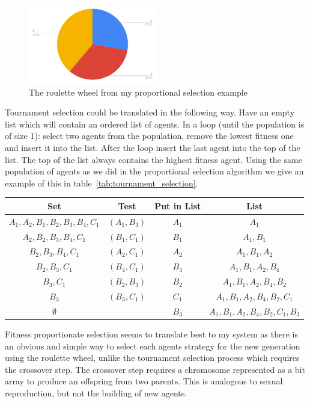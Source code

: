 \documentclass[]{final_report}
\begin{document}
\begin{figure}
	\begin{center}
	\includegraphics[width=0.5\textwidth]{reproduction_chart.png}
	\caption{The roulette wheel from my proportional selection example}
	\label{fig:roulette_wheel}
	\end{center}
\end{figure}
Tournament selection could be translated in the following way. Have an empty list which will contain an ordered list of agents. In a loop (until the population is of size 1): select two agents from the population, remove the lowest fitness one and insert it into the list. After the loop insert the last agent into the top of the list. The top of the list always contains the highest fitness agent. Using the same population of agents as we did in the proportional selection algorithm we give an example of this in table~\ref{tab:tournament_selection}.
\begin{framed}
	\begin{center}
		\begin{tabular}{c|c|c|c}
		Set & Test & Put in List & List\\
		\hline
		${A_1, A_2, B_1, B_2, B_3, B_4, C_1}$ & $(A_1, B_3)$ & $A_1$ & ${A_1}$ \\
		${A_2, B_2, B_3, B_4, C_1}$ & $(B_1, C_1)$ & $B_1$ & ${A_1, B_1}$\\
		${B_2, B_3, B_4, C_1}$ & $(A_2, C_1)$ & $A_2$ & ${A_1, B_1, A_2}$\\
		${B_2, B_3, C_1}$ & $(B_4, C_1)$ & $B_4$ & ${A_1, B_1, A_2, B_4}$\\
		${B_3, C_1}$ & $(B_2, B_3)$ & $B_2$ & ${A_1, B_1, A_2, B_4, B_2}$\\
		${B_3}$ & $(B_3, C_1)$ & $C_1$ & ${A_1, B_1, A_2, B_4, B_2, C_1}$\\
		$\emptyset$	& & $B_3$ & ${A_1, B_1, A_2, B_4, B_2, C_1, B_3}$
		\end{tabular}
		\label{tab:tournament_selection}
	\end{center}	
\end{framed}
Fitness proportionate selection seems to translate best to my system as there is an obvious and simple way to select each agents strategy for the new generation using the roulette wheel, unlike the tournament selection process which requires the crossover step. The crossover step requires a chromosome represented as a bit array to produce an offspring from two parents. This is analogous to sexual reproduction, but not the building of new agents.\par
\end{document}
